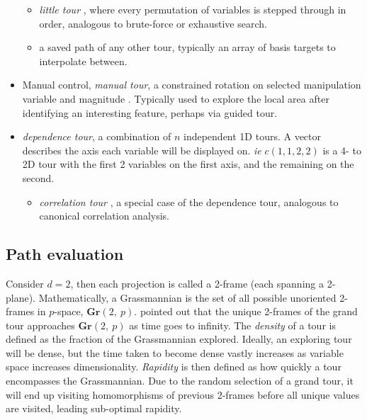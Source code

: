 \documentclass{monashthesis}
\begin{document}
\begin{itemize}
  \begin{itemize}
  \tightlist
  \item
    \emph{little tour} \autocite{mcdonald_interactive_1982}, where every
    permutation of variables is stepped through in order, analogous to
    brute-force or exhaustive search.
  \item
    a saved path of any other tour, typically an array of basis targets
    to interpolate between.
  \end{itemize}
\item
  Manual control, \emph{manual tour}, a constrained rotation on selected
  manipulation variable and magnitude \autocite{cook_manual_1997}.
  Typically used to explore the local area after identifying an
  interesting feature, perhaps via guided tour.
\item
  \emph{dependence tour}, a combination of \(n\) independent 1D tours. A
  vector describes the axis each variable will be displayed on.
  \emph{ie} \(c(1, 1, 2, 2)\) is a 4- to 2D tour with the first 2
  variables on the first axis, and the remaining on the second.

  \begin{itemize}
  \tightlist
  \item
    \emph{correlation tour} \autocite{buja_data_1987}, a special case of
    the dependence tour, analogous to canonical correlation analysis.
  \end{itemize}
\end{itemize}

\subsection{Path evaluation}\label{path-evaluation}

Consider \(d=2\), then each projection is called a 2-frame (each
spanning a 2-plane). Mathematically, a Grassmannian is the set of all
possible unoriented 2-frames in \(p\)-space, \(\textbf{Gr}(2,~p)\).
\textcite{asimov_grand_1985} pointed out that the unique 2-frames of the
grand tour approaches \(\textbf{Gr}(2,~p)\) as time goes to infinity.
The \emph{density} of a tour is defined as the fraction of the
Grassmannian explored. Ideally, an exploring tour will be dense, but the
time taken to become dense vastly increases as variable space increases
dimensionality. \emph{Rapidity} is then defined as how quickly a tour
encompasses the Grassmannian. Due to the random selection of a grand
tour, it will end up visiting homomorphisms of previous 2-frames before
all unique values are visited, leading sub-optimal rapidity.
\end{document}
